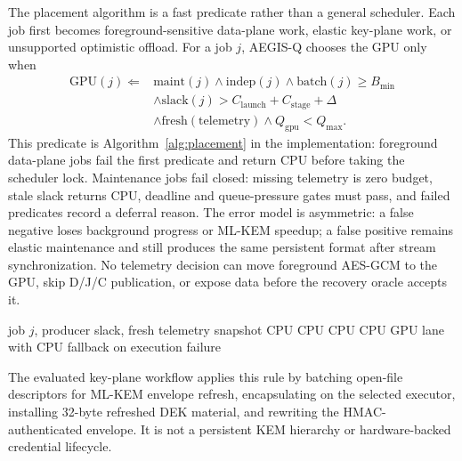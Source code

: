 The placement algorithm is a fast predicate rather than a general scheduler.  Each job first becomes foreground-sensitive data-plane work, elastic key-plane work, or unsupported optimistic offload.  For a job \(j\), AEGIS-Q chooses the GPU only when
\[
\begin{aligned}
\mathrm{GPU}(j) \Leftarrow{}&
\mathrm{maint}(j) \wedge \mathrm{indep}(j)
\wedge \mathrm{batch}(j) \ge B_{\min} \\
&\wedge \mathrm{slack}(j) > C_{\mathrm{launch}} + C_{\mathrm{stage}} + \Delta \\
&\wedge \mathrm{fresh}(\mathrm{telemetry}) \wedge Q_{\mathrm{gpu}} < Q_{\max}.
\end{aligned}
\]
This predicate is Algorithm~\ref{alg:placement} in the implementation: foreground data-plane jobs fail the first predicate and return CPU before taking the scheduler lock.  Maintenance jobs fail closed: missing telemetry is zero budget, stale slack returns CPU, deadline and queue-pressure gates must pass, and failed predicates record a deferral reason.  The error model is asymmetric: a false negative loses background progress or ML-KEM speedup; a false positive remains elastic maintenance and still produces the same persistent format after stream synchronization.  No telemetry decision can move foreground AES-GCM to the GPU, skip D/J/C publication, or expose data before the recovery oracle accepts it.

\begin{algorithm}[t]
\caption{Elastic placement admission}
\label{alg:placement}
\begin{algorithmic}[1]
\Require job \(j\), producer slack, fresh telemetry snapshot
  \State \Return CPU
\EndIf
{}
  \State \Return CPU
\EndIf
{}
  \State \Return CPU
\EndIf
{}
  \State \Return CPU
\EndIf
\State \Return GPU lane with CPU fallback on execution failure
\end{algorithmic}
\end{algorithm}

The evaluated key-plane workflow applies this rule by batching open-file descriptors for ML-KEM envelope refresh, encapsulating on the selected executor, installing 32-byte refreshed DEK material, and rewriting the HMAC-authenticated envelope.  It is not a persistent KEM hierarchy or hardware-backed credential lifecycle.


